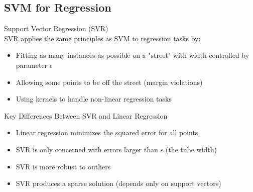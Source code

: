\subsection{SVM for Regression}

\begin{definition}{Support Vector Regression (SVR)}\\
SVR applies the same principles as SVM to regression tasks by:
\begin{itemize}
    \item Fitting as many instances as possible on a "street" with width controlled by parameter $\epsilon$
    \item Allowing some points to be off the street (margin violations)
    \item Using kernels to handle non-linear regression tasks
\end{itemize}
\end{definition}

\begin{concept}{Key Differences Between SVR and Linear Regression}\\
\begin{itemize}
    \item Linear regression minimizes the squared error for all points
    \item SVR is only concerned with errors larger than $\epsilon$ (the tube width)
    \item SVR is more robust to outliers
    \item SVR produces a sparse solution (depends only on support vectors)
\end{itemize}
\end{concept}

